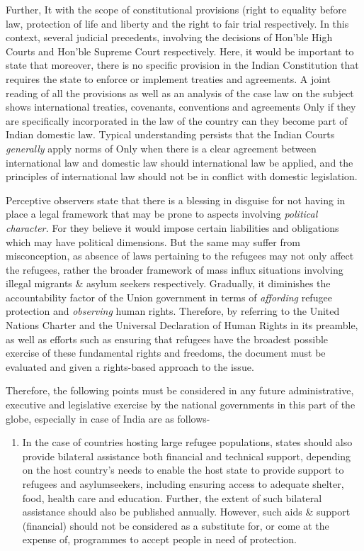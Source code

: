 \begin{multicols}{2}
\noi
Further, It with the scope of constitutional provisions (right to equality before law, protection
of life and liberty and the right to fair trial respectively. In this context, several judicial
precedents, involving the decisions of Hon’ble High Courts and Hon’ble Supreme Court
respectively. Here, it would be important to state that moreover, there is no specific provision
in the Indian Constitution that requires the state to enforce or implement treaties and
agreements. A joint reading of all the provisions as well as an analysis of the case law on the
subject shows international treaties, covenants, conventions and agreements Only if they are
specifically incorporated in the law of the country can they become part of Indian domestic
law. Typical understanding persists that the Indian Courts \textit{generally} apply norms of Only
when there is a clear agreement between international law and domestic law should
international law be applied, and the principles of international law should not be in conflict
with domestic legislation.

\noi
Perceptive observers state that there is a blessing in disguise for not having in place a legal
framework that may be prone to aspects involving \textit{political character.} For they believe it
would impose certain liabilities and obligations which may have political dimensions. But the
same may suffer from misconception, as absence of laws pertaining to the refugees may not
only affect the refugees, rather the broader framework of mass influx situations involving
illegal migrants \& asylum seekers respectively. Gradually, it diminishes the accountability
factor of the Union government in terms of \textit{affording} refugee protection and \textit{observing} human rights. Therefore, by referring to the United Nations Charter and the Universal Declaration of
Human Rights in its preamble, as well as efforts such as ensuring that refugees have the
broadest possible exercise of these fundamental rights and freedoms, the document must be
evaluated and given a rights-based approach to the issue.


\noi
Therefore, the following points must be considered in any future administrative, executive
and legislative exercise by the national governments in this part of the globe, especially in
case of India are as follows-

\begin{enumerate}[label=$\bullet$]
\item In the case of countries hosting large refugee populations, states should also provide
bilateral assistance both financial and technical support, depending on the host
country’s needs to enable the host state to provide support to refugees and asylumseekers, including ensuring access to adequate shelter, food, health care and education.
Further, the extent of such bilateral assistance should also be published annually.
However, such aids \& support (financial) should not be considered as a substitute for,
or come at the expense of, programmes to accept people in need of protection.


\end{enumerate}
\end{multicols}
